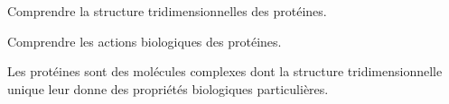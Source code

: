 \teteTermStssBiom
\vspace*{-40pt}

\begin{objectifs}
  \item Comprendre la structure tridimensionnelles des protéines.
  \item Comprendre les actions biologiques des protéines.
\end{objectifs}

\begin{contexte}
  Les protéines sont des molécules complexes dont la structure tridimensionnelle unique leur donne des propriétés biologiques particulières.
  
\end{contexte}


